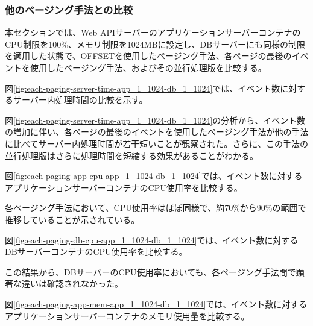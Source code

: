 \documentclass[../../../../main]{subfiles}
\begin{document}
    \subsubsection{他のページング手法との比較}\label{subsubsec:result-each-paging-only-limit}

    本セクションでは、Web APIサーバーのアプリケーションサーバーコンテナのCPU制限を100\%、メモリ制限を1024MBに設定し、DBサーバーにも同様の制限を適用した状態で、OFFSETを使用したページング手法、各ページの最後のイベントを使用したページング手法、およびその並行処理版を比較する。

    \label{subsubsubsec:result-each-paging-only-limit-server-time}

    図\ref{fig:each-paging-server-time-app_1_1024-db_1_1024}では、イベント数に対するサーバー内処理時間の比較を示す。

    

    図\ref{fig:each-paging-server-time-app_1_1024-db_1_1024}の分析から、イベント数の増加に伴い、各ページの最後のイベントを使用したページング手法が他の手法に比べてサーバー内処理時間が若干短いことが観察された。さらに、この手法の並行処理版はさらに処理時間を短縮する効果があることがわかる。

    \label{subsubsubsec:result-each-paging-only-limit-cpu}

    図\ref{fig:each-paging-app-cpu-app_1_1024-db_1_1024}では、イベント数に対するアプリケーションサーバーコンテナのCPU使用率を比較する。

    

    各ページング手法において、CPU使用率はほぼ同様で、約70\%から90\%の範囲で推移していることが示されている。

    図\ref{fig:each-paging-db-cpu-app_1_1024-db_1_1024}では、イベント数に対するDBサーバーコンテナのCPU使用率を比較する。

    

    この結果から、DBサーバーのCPU使用率においても、各ページング手法間で顕著な違いは確認されなかった。

    \label{subsubsubsec:result-each-paging-only-limit-mem}

    図\ref{fig:each-paging-app-mem-app_1_1024-db_1_1024}では、イベント数に対するアプリケーションサーバーコンテナのメモリ使用量を比較する。
\end{document}
